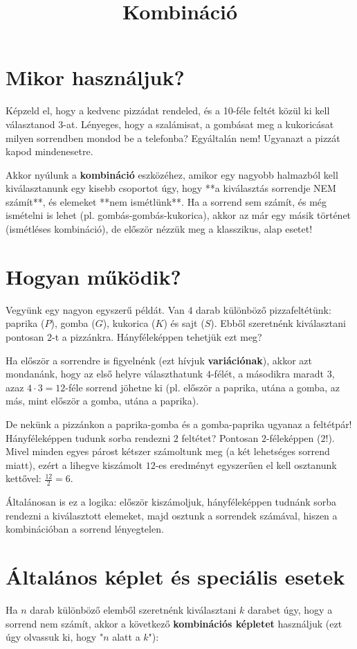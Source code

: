 \documentclass[11pt,a4paper]{article}
\title{Kombináció}
\author{}
\date{}
\begin{document}
\maketitle



\section{Mikor használjuk?}
Képzeld el, hogy a kedvenc pizzádat rendeled, és a 10-féle feltét közül ki kell választanod 3-at. Lényeges, hogy a szalámisat, a gombásat meg a kukoricásat milyen sorrendben mondod be a telefonba? Egyáltalán nem! Ugyanazt a pizzát kapod mindenesetre. 

Akkor nyúlunk a \textbf{kombináció} eszközéhez, amikor egy nagyobb halmazból kell kiválasztanunk egy kisebb csoportot úgy, hogy **a kiválasztás sorrendje NEM számít**, és elemeket **nem ismétlünk**. Ha a sorrend sem számít, és még ismételni is lehet (pl. gombás-gombás-kukorica), akkor az már egy másik történet (ismétléses kombináció), de először nézzük meg a klasszikus, alap esetet!

\section{Hogyan működik?}
Vegyünk egy nagyon egyszerű példát. Van $4$ darab különböző pizzafeltétünk: paprika ($P$), gomba ($G$), kukorica ($K$) és sajt ($S$). Ebből szeretnénk kiválasztani pontosan $2$-t a pizzánkra. Hányféleképpen tehetjük ezt meg?

Ha először a sorrendre is figyelnénk (ezt hívjuk \textbf{variációnak}), akkor azt mondanánk, hogy az első helyre választhatunk $4$-félét, a másodikra maradt $3$, azaz $4 \cdot 3 = 12$-féle sorrend jöhetne ki (pl. először a paprika, utána a gomba, az más, mint először a gomba, utána a paprika). 

De nekünk a pizzánkon a paprika-gomba és a gomba-paprika ugyanaz a feltétpár! Hányféleképpen tudunk sorba rendezni $2$ feltétet? Pontosan $2$-féleképpen ($2!$). Mivel minden egyes párost kétszer számoltunk meg (a két lehetséges sorrend miatt), ezért a lihegve kiszámolt $12$-es eredményt egyszerűen el kell osztanunk kettővel: $\frac{12}{2} = 6$.

Általánosan is ez a logika: először kiszámoljuk, hányféleképpen tudnánk sorba rendezni a kiválasztott elemeket, majd osztunk a sorrendek számával, hiszen a kombinációban a sorrend lényegtelen.

\section{Általános képlet és speciális esetek}
Ha $n$ darab különböző elemből szeretnénk kiválasztani $k$ darabet úgy, hogy a sorrend nem számít, akkor a következő \textbf{kombinációs képletet} használjuk (ezt úgy olvassuk ki, hogy "$n$ alatt a $k$"):
\end{document}
